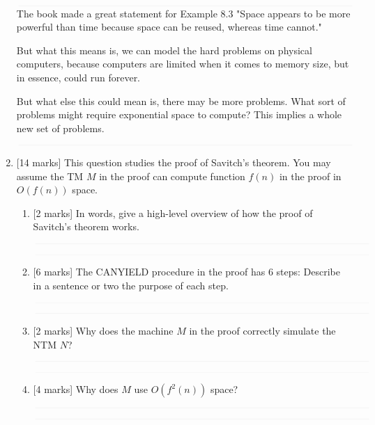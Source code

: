 \documentclass{article}
\begin{document}
\begin{enumerate}
            $\textcolor[RGB]{220,220,220}{\rule{\linewidth}{0.2pt}}$
            The book made a great statement for Example 8.3 "Space appears to be more powerful than time because space can be reused, whereas time cannot."

            But what this means is, we can model the hard problems on physical computers, because computers are limited when it comes to memory size, but in essence, could run forever.

            But what else this could mean is, there may be more problems. What sort of problems might require exponential space to compute? This implies a whole new set of problems.

            $\textcolor[RGB]{220,220,220}{\rule{\linewidth}{0.2pt}}$

            \item {[14 marks]} This question studies the proof of Savitch's theorem. You may assume the TM $M$ in the proof can compute function $f(n)$ in the proof in $O(f(n))$ space.
            \begin{enumerate}
                \item {[2 marks]} In words, give a high-level overview of how the proof of Savitch's theorem works.

            $\textcolor[RGB]{220,220,220}{\rule{\linewidth}{0.2pt}}$

            $\textcolor[RGB]{220,220,220}{\rule{\linewidth}{0.2pt}}$

                \item {[6 marks]} The CANYIELD procedure in the proof has 6 steps: Describe in a sentence or two the purpose of each step.

            $\textcolor[RGB]{220,220,220}{\rule{\linewidth}{0.2pt}}$

            $\textcolor[RGB]{220,220,220}{\rule{\linewidth}{0.2pt}}$

                \item {[2 marks]} Why does the machine $M$ in the proof correctly simulate the NTM $N$?

            $\textcolor[RGB]{220,220,220}{\rule{\linewidth}{0.2pt}}$

            $\textcolor[RGB]{220,220,220}{\rule{\linewidth}{0.2pt}}$

                \item {[4 marks]} Why does $M$ use $O(f^2(n))$ space?

            $\textcolor[RGB]{220,220,220}{\rule{\linewidth}{0.2pt}}$

            $\textcolor[RGB]{220,220,220}{\rule{\linewidth}{0.2pt}}$

            \end{enumerate}
\end{enumerate}
\end{document}

